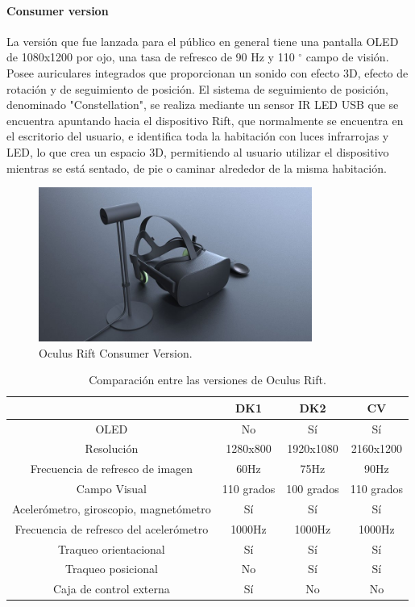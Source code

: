 \documentclass[12pt]{article}
\begin{document}
\paragraph{Consumer version}
La versión que fue lanzada para el público en general tiene una pantalla OLED de 1080x1200 por ojo, una tasa de refresco de 90 Hz y 110 $^{\circ}$ campo de visión. Posee auriculares integrados que proporcionan un sonido con efecto 3D, efecto de rotación y de seguimiento de posición. El sistema de seguimiento de posición, denominado "Constellation", se realiza mediante un sensor IR LED USB que se encuentra apuntando hacia el dispositivo Rift, que normalmente se encuentra en el escritorio del usuario, e identifica toda la habitación con luces infrarrojas y LED, lo que crea un espacio 3D, permitiendo al usuario utilizar el dispositivo mientras se está sentado, de pie o caminar alrededor de la misma habitación. 
\begin{figure}[h!]
\includegraphics[width=0.8\textwidth,center]{cv.jpg}
\caption{Oculus Rift Consumer Version.}
\end{figure}
\begin{table}[h!]
  \centering
  \label{tab:table1}
  \begin{tabular}{cccc}
    \toprule
     & DK1 & DK2 & CV\\
    \midrule
    OLED & No & Sí & Sí\\
    Resolución & 1280x800 & 1920x1080 & 2160x1200 \\
    Frecuencia de refresco de imagen & 60Hz & 75Hz & 90Hz\\
    Campo Visual & 110 grados & 100 grados & 110 grados\\
    Acelerómetro, giroscopio, magnetómetro & Sí & Sí & Sí\\  
    Frecuencia de refresco del acelerómetro & 1000Hz& 1000Hz & 1000Hz\\
    Traqueo orientacional & Sí & Sí & Sí\\ 
    Traqueo posicional & No & Sí & Sí\\
    Caja de control externa & Sí & No & No\\
    \bottomrule
  \end{tabular}
  \caption{Comparación entre las versiones de Oculus Rift.}
\end{table}
\clearpage
\end{document}
